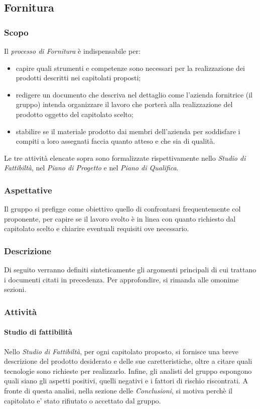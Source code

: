 
\subsection{Fornitura}

	\subsubsection{Scopo}
	\text Il \textit{processo di Fornitura} è indispensabile per:
	\begin{itemize}
	\item capire quali strumenti e competenze sono necessari per la realizzazione dei prodotti descritti nei capitolati proposti;
	\item redigere un documento che descriva nel dettaglio come l'azienda fornitrice (il gruppo) intenda organizzare il lavoro che porterà alla realizzazione del prodotto oggetto del capitolato scelto;
	\item stabilire se il materiale prodotto dai membri dell'azienda per soddisfare i compiti a loro assegnati faccia quanto atteso e che sia di qualità.    
	\end{itemize}
Le tre attività elencate sopra sono formalizzate rispettivamente nello \textit{Studio di Fattibiltà}, nel \textit{Piano di Progetto} e nel \textit{Piano di Qualifica}.
 	\subsubsection{Aspettative}
Il gruppo si prefigge come obiettivo quello di confrontarsi frequentemente col proponente, per capire se il lavoro svolto è in linea con quanto richiesto dal capitolato scelto e chiarire eventuali requisiti ove necessario.
	\subsubsection{Descrizione}
	Di seguito verranno definiti sinteticamente gli argomenti principali di cui trattano i documenti citati in precedenza. Per approfondire, si rimanda alle omonime sezioni. 
	\subsubsection{Attività}

		\paragraph{Studio di fattibilità}
		Nello \textit{Studio di Fattibiltà}, per ogni capitolato proposto, si fornisce una breve descrizione del prodotto desiderato e delle sue caretteristiche, oltre a citare quali tecnologie sono richieste per realizzarlo. Infine, gli analisti del gruppo espongono quali siano gli aspetti positivi, quelli negativi e i fattori di rischio riscontrati. A fronte di questa analisi, nella sezione delle \textit{Conclusioni}, si motiva perchè il capitolato e' stato rifiutato o accettato dal gruppo.  
